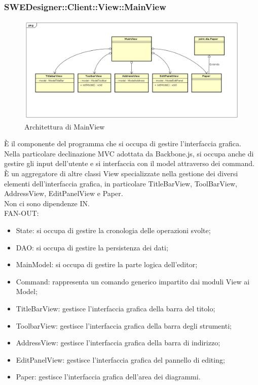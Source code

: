 \documentclass[../PianoDiQualifica.tex]{subfiles}
\begin{document}
		\subsubsection{SWEDesigner::Client::View::MainView}
			\begin{figure}[H]\label{fig:MainModel}
				\centering
				\includegraphics[scale=0.44]{Immagini/DiagrammaArchitettura/MainView.png}
				\caption{Architettura di MainView}
			\end{figure}
		È il componente del programma che si occupa di gestire l'interfaccia grafica. Nella particolare declinazione MVC adottata da Backbone.js, si occupa anche di gestire gli input dell'utente e si interfaccia con il model attraverso dei command. È un aggregatore di altre classi View specializzate nella gestione dei diversi elementi dell'interfaccia grafica, in particolare TitleBarView, ToolBarView, AddressView, EditPanelView e Paper.\\
		Non ci sono dipendenze IN.\\
			FAN-OUT:
			\begin{itemize}
				\item State: si occupa di gestire la cronologia delle operazioni svolte;
				\item DAO: si occupa di gestire la persistenza dei dati;
				\item MainModel: si occupa di gestire la parte logica dell'editor;
				\item Command: rappresenta un comando generico impartito dai moduli View ai Model;
				\item TitleBarView: gestisce l'interfaccia grafica della barra del titolo;
				\item ToolbarView: gestisce l'interfaccia grafica della barra degli strumenti;
				\item AddressView: gestisce l'interfaccia grafica della barra di indirizzo;
				\item EditPanelView: gestisce l'interfaccia grafica del pannello di editing;
				\item Paper: gestisce l'interfaccia grafica dell'area dei diagrammi.
			\end{itemize}
\end{document}
